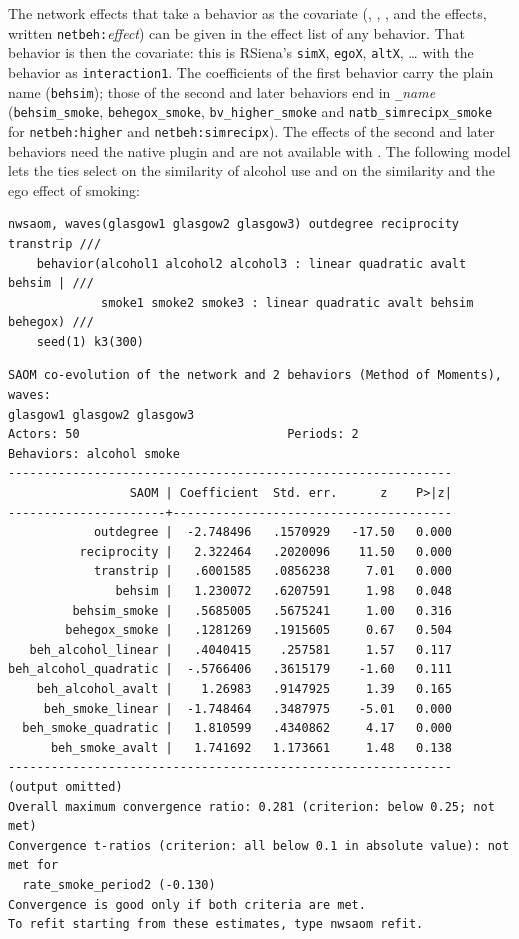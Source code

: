 The network effects that take a behavior as the covariate (, , ,  and the  effects, written \texttt{netbeh:}\emph{effect}) can be given in the effect list of any behavior. That behavior is then the covariate: this is RSiena's \texttt{simX}, \texttt{egoX}, \texttt{altX}, \dots{} with the behavior as \texttt{interaction1}. The coefficients of the first behavior carry the plain name (\texttt{behsim}); those of the second and later behaviors end in \texttt{\_}\emph{name} (\texttt{behsim\_smoke}, \texttt{behegox\_smoke}, \texttt{bv\_higher\_smoke} and \texttt{natb\_simrecipx\_smoke} for \texttt{netbeh:higher} and \texttt{netbeh:simrecipx}). The effects of the second and later behaviors need the native plugin and are not available with . The following model lets the ties select on the similarity of alcohol use and on the similarity and the ego effect of smoking:
\begin{lstlisting}
nwsaom, waves(glasgow1 glasgow2 glasgow3) outdegree reciprocity transtrip ///
    behavior(alcohol1 alcohol2 alcohol3 : linear quadratic avalt behsim | ///
             smoke1 smoke2 smoke3 : linear quadratic avalt behsim behegox) ///
    seed(1) k3(300)
\end{lstlisting}
\begin{lstlisting}
SAOM co-evolution of the network and 2 behaviors (Method of Moments), waves:
glasgow1 glasgow2 glasgow3
Actors: 50                             Periods: 2
Behaviors: alcohol smoke
--------------------------------------------------------------
                 SAOM | Coefficient  Std. err.      z    P>|z|
----------------------+---------------------------------------
            outdegree |  -2.748496   .1570929   -17.50   0.000
          reciprocity |   2.322464   .2020096    11.50   0.000
            transtrip |   .6001585   .0856238     7.01   0.000
               behsim |   1.230072   .6207591     1.98   0.048
         behsim_smoke |   .5685005   .5675241     1.00   0.316
        behegox_smoke |   .1281269   .1915605     0.67   0.504
   beh_alcohol_linear |   .4040415    .257581     1.57   0.117
beh_alcohol_quadratic |  -.5766406   .3615179    -1.60   0.111
    beh_alcohol_avalt |    1.26983   .9147925     1.39   0.165
     beh_smoke_linear |  -1.748464   .3487975    -5.01   0.000
  beh_smoke_quadratic |   1.810599   .4340862     4.17   0.000
      beh_smoke_avalt |   1.741692   1.173661     1.48   0.138
--------------------------------------------------------------
(output omitted)
Overall maximum convergence ratio: 0.281 (criterion: below 0.25; not met)
Convergence t-ratios (criterion: all below 0.1 in absolute value): not met for
  rate_smoke_period2 (-0.130)
Convergence is good only if both criteria are met.
To refit starting from these estimates, type nwsaom refit.
\end{lstlisting}
